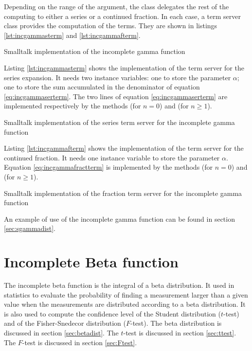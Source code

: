 Depending on the range of the argument, the class delegates the
rest of the computing to either a series or a continued fraction.
In each case, a term server class provides the computation of the
terms. They are shown in listings \ref{lst:incgammasterm} and \ref{lst:incgammafterm}.
\begin{listing} Smalltalk implementation of the incomplete gamma function \label{lst:incgamma}

\end{listing}
Listing \ref{lst:incgammasterm} shows the implementation of the
term server for the series expansion. It needs two instance
variables: one to store the parameter $\alpha$; one to store the
sum accumulated in the denominator of equation
\ref{eq:incgammaserterm}. The two lines of equation
\ref{eq:incgammaserterm} are implemented respectively by the
methods   (for $n=0$) and  (for
$n\ge 1$).
\begin{listing} Smalltalk implementation of the series term server for the incomplete gamma function \label{lst:incgammasterm}

\end{listing}
Listing \ref{lst:incgammafterm} shows the implementation of the
term server for the continued fraction. It needs one instance
variable to store the parameter $\alpha$. Equation
\ref{eq:incgammafractterm} is implemented by the methods   (for $n=0$) and  (for $n\ge 1$).
\begin{listing} Smalltalk implementation of the fraction term server for the incomplete gamma function \label{lst:incgammafterm}

\end{listing}
An example of use of the incomplete gamma function can be found in
section \ref{sec:sgammadist}.


\section{Incomplete Beta function}
\label{sec:incbeta} The incomplete beta function is the integral
of a beta distribution. It used in statistics to evaluate the
probability of finding a measurement larger than a given value
when the measurements are distributed according to a beta
distribution. It is also used to compute the confidence level of
the Student distribution ($t$-test) and of the Fisher-Snedecor
distribution ($F$-test). The beta distribution is discussed in
section \ref{sec:betadist}. The $t$-test is discussed in section
\ref{sec:ttest}. The $F$-test is discussed in section
\ref{sec:Ftest}.

